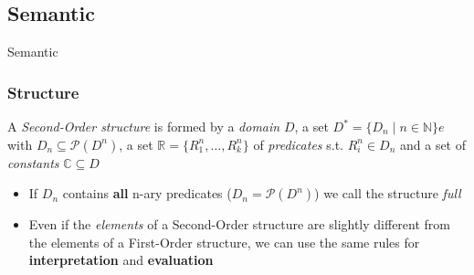 \documentclass{beamer}
\begin{document}
            \subsection{Semantic}
                \begin{frame}
                    \vspace*{1cm}
                    \begin{center}
                        \begin{Huge}
                            \textcolor{title_blue}{Semantic}
                        \end{Huge}
                    \end{center}
                \end{frame}

                \begin{frame}
                    \frametitle{Structure}
                    \begin{definition}
                        A \textit{Second-Order structure} is formed by a \textit{domain} $ D $, a set $ D^* = \{ D_n\; \vert\; n \in \mathbb{N} \}e$ with $ D_n \subseteq \mathcal{P}(D^n) $, a set $ \mathbb{R} = \{ R_1^n, \dots, R_k^n \} $ of \textit{predicates} s.t. $ R_i^n \in D_n $ and a set of \textit{constants} $ \mathbb{C} \subseteq D $
                    \end{definition}
                    \begin{itemize}
                        \item If $ D_n $ contains \textbf{all} n-ary predicates ($ D_n = \mathcal{P}(D^n) $) we call the structure \textit{full}
                        \item Even if the \textit{elements} of a Second-Order structure are slightly different from the elements of a First-Order structure, we can use the same rules for \textbf{interpretation} and \textbf{evaluation}
                    \end{itemize}
                \end{frame}
                
\end{document}
